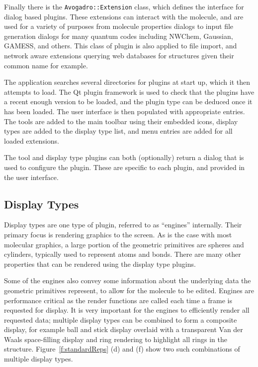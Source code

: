 \documentclass[10pt]{bmc_article}
\newenvironment{bmcformat}{\begin{raggedright}
\baselineskip20pt\sloppy\setboolean{publ}{false}}{\end{raggedright}
\baselineskip20pt\sloppy}
\begin{document}
\begin{bmcformat}
Finally there is the {\tt Avogadro::Extension} class, which defines the interface for
dialog based plugins. These extensions can interact with the molecule, and are
used for a variety of purposes from molecule properties dialogs to input file
generation dialogs for many quantum codes including NWChem, Gaussian, GAMESS, and
others. This class of plugin is also applied to file import, and network aware
extensions querying web databases for structures given their common name for
example.

The application searches several directories for plugins at start up,
which it then attempts to load. The Qt plugin framework is used to check that
the plugins have a recent enough version to be loaded, and the plugin type can
be deduced once it has been loaded. The user interface is then populated with
appropriate entries. The tools are added to the main toolbar using their
embedded icons, display types are added to the display type list, and menu
entries are added for all loaded extensions.

The tool and display type plugins can both (optionally) return a dialog that is
used to configure the plugin. These are specific to each plugin, and provided in
the user interface.

\subsection{Display Types}

Display types are one type of plugin, referred to as ``engines'' internally. Their
primary focus is rendering graphics to the screen. As is the case with most
molecular graphics, a large portion of the geometric primitives are spheres and
cylinders, typically used to represent atoms and bonds. There are many other
properties that can be rendered using the display type plugins.

Some of the engines also convey some information about the underlying data the
geometric primitives represent, to allow for the molecule to be edited.
Engines are performance critical as the render functions are called each time a
frame is requested for display. It is very important for the engines to
efficiently render all requested data; multiple display types can be
combined to form a composite display, for example ball and stick display
overlaid with a transparent Van der Waals space-filling display and ring
rendering to highlight all rings in the structure. Figure~\ref{f:standardReps}
(d) and (f) show two such combinations of multiple display types.


\end{bmcformat}
\end{document}
